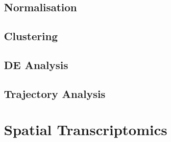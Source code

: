 \documentclass[aspectratio=169,11pt]{beamer}
\begin{document}
\subsection{Normalisation}

\subsection{Clustering}

\subsection{DE Analysis}

\subsection{Trajectory Analysis}

\section{Spatial Transcriptomics}
\end{document}
